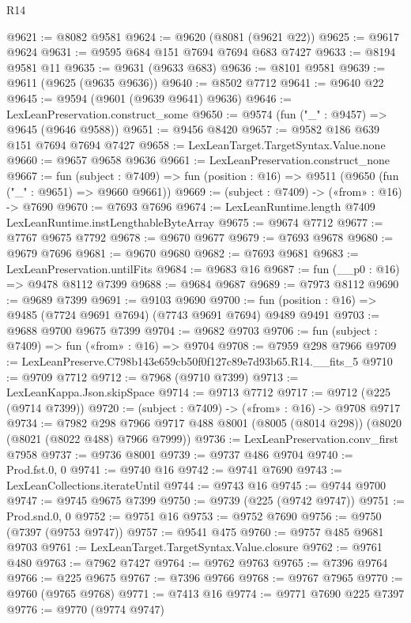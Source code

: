 \begin{lexlean}{R14}
\begin{coremodule}
@9621 := @8082 @9581
@9624 := @9620 (@8081 (@9621 @22))
@9625 := @9617 @9624
@9631 := @9595 @684 @151 @7694 @7694 @683 @7427
@9633 := @8194 @9581 @11
@9635 := @9631 (@9633 @683)
@9636 := @8101 @9581
@9639 := @9611 (@9625 (@9635 @9636))
@9640 := @8502 @7712
@9641 := @9640 @22
@9645 := @9594 (@9601 (@9639 @9641) @9636)
@9646 := LexLeanPreservation.construct_some
@9650 := @9574 (fun ("_" : @9457) => @9645 (@9646 @9588))
@9651 := @9456 @8420
@9657 := @9582 @186 @639 @151 @7694 @7694 @7427
@9658 := LexLeanTarget.TargetSyntax.Value.none
@9660 := @9657 @9658 @9636
@9661 := LexLeanPreservation.construct_none
@9667 := fun (subject : @7409) =>
  fun (position : @16) => @9511 (@9650 (fun ("_" : @9651) => @9660 @9661))
@9669 := (subject : @7409) -> («from» : @16) -> @7690
@9670 := @7693 @7696
@9674 := LexLeanRuntime.length @7409 LexLeanRuntime.instLengthableByteArray
@9675 := @9674 @7712
@9677 := @7767 @9675 @7792
@9678 := @9670 @9677
@9679 := @7693 @9678
@9680 := @9679 @7696
@9681 := @9670 @9680
@9682 := @7693 @9681
@9683 := LexLeanPreservation.untilFits
@9684 := @9683 @16
@9687 := fun (__p0 : @16) => @9478 @8112 @7399
@9688 := @9684 @9687
@9689 := @7973 @8112
@9690 := @9689 @7399
@9691 := @9103 @9690
@9700 := fun (position : @16) => @9485 (@7724 @9691 @7694) (@7743 @9691 @7694) @9489 @9491
@9703 := @9688 @9700 @9675 @7399
@9704 := @9682 @9703
@9706 := fun (subject : @7409) => fun («from» : @16) => @9704
@9708 := @7959 @298 @7966
@9709 := LexLeanPreserve.C798b143e659cb50f0f127c89e7d93b65.R14.__fits_5
@9710 := @9709 @7712
@9712 := @7968 (@9710 @7399)
@9713 := LexLeanKappa.Json.skipSpace
@9714 := @9713 @7712
@9717 := @9712 (@225 (@9714 @7399))
@9720 := (subject : @7409) -> («from» : @16) -> @9708 @9717
@9734 := @7982
    @298
    @7966
    @9717
    @488
    @8001
    (@8005 (@8014 @298))
    (@8020 (@8021 (@8022 @488) @7966 @7999))
@9736 := LexLeanPreservation.conv_first @7958
@9737 := @9736 @8001
@9739 := @9737 @486 @9704
@9740 := Prod.fst.{0, 0}
@9741 := @9740 @16
@9742 := @9741 @7690
@9743 := LexLeanCollections.iterateUntil
@9744 := @9743 @16
@9745 := @9744 @9700
@9747 := @9745 @9675 @7399
@9750 := @9739 (@225 (@9742 @9747))
@9751 := Prod.snd.{0, 0}
@9752 := @9751 @16
@9753 := @9752 @7690
@9756 := @9750 (@7397 (@9753 @9747))
@9757 := @9541 @475
@9760 := @9757 @485 @9681 @9703
@9761 := LexLeanTarget.TargetSyntax.Value.closure
@9762 := @9761 @480
@9763 := @7962 @7427
@9764 := @9762 @9763
@9765 := @7396 @9764
@9766 := @225 @9675
@9767 := @7396 @9766
@9768 := @9767 @7965
@9770 := @9760 (@9765 @9768)
@9771 := @7413 @16
@9774 := @9771 @7690 @225 @7397
@9776 := @9770 (@9774 @9747)

\end{coremodule}
\end{lexlean}
